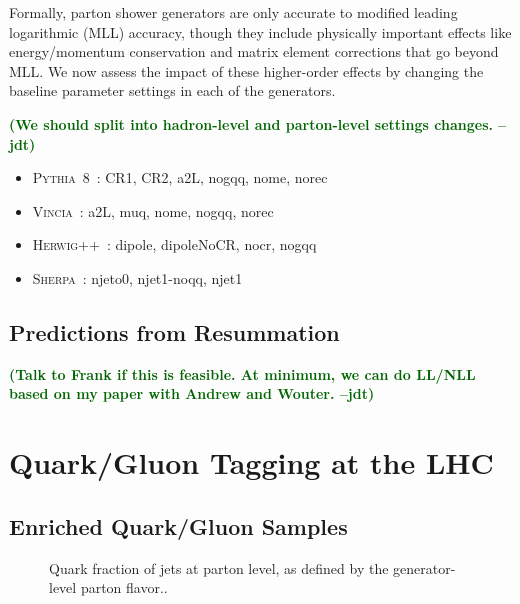 \documentclass[11pt,letterpaper]{article}
\newcommand{\pythia}{\textsc{Pythia~8}\xspace}
\newcommand{\herwig}{\textsc{Herwig++}\xspace}
\newcommand{\vincia}{\textsc{Vincia}\xspace}
\newcommand{\sherpa}{\textsc{Sherpa}\xspace}
\newcommand{\jdt}[1]{\textbf{\textcolor{darkgreen}{(#1 --jdt)}}}
\begin{document}
Formally, parton shower generators are only accurate to modified leading logarithmic (MLL) accuracy, though they include physically important effects like energy/momentum conservation and matrix element corrections that go beyond MLL.  We now assess the impact of these higher-order effects by changing the baseline parameter settings in each of the generators.

\jdt{We should split into hadron-level and parton-level settings changes.}


\begin{itemize}
\item \pythia\ : CR1, CR2, a2L, nogqq, nome, norec
\item \vincia\ : a2L, muq, nome, nogqq, norec
\item \herwig\ : dipole, dipoleNoCR, nocr, nogqq
\item \sherpa\ : njeto0, njet1-noqq, njet1
\end{itemize}

\clearpage

\subsection{Predictions from Resummation}

\jdt{Talk to Frank if this is feasible.  At minimum, we can do LL/NLL based on my paper with Andrew and Wouter.}

\section{Quark/Gluon Tagging at the LHC}
\label{sec:pp}

\subsection{Enriched Quark/Gluon Samples}

\begin{figure}
\centering
{}
\caption{Quark fraction of jets at parton level, as defined by the generator-level parton flavor..}
\label{fig:parton_level_qg_composition}
\end{figure}
\end{document}

